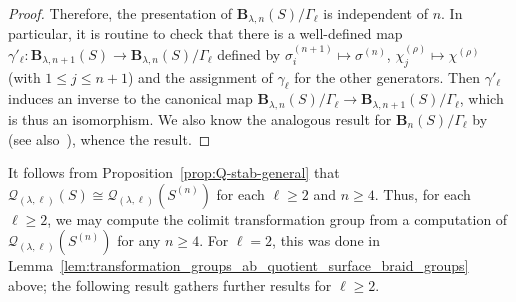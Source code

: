 \documentclass[AHL,Unicode,published]{cedram}
\newcommand{\B}{\ensuremath{\mathbf{B}}}
\newcommand{\LCS}{\varGamma}
\newcommand{\cQ}{\mathcal{Q}}
\renewcommand{\geq}{\geqslant}
\renewcommand{\leq}{\leqslant}
\begin{document}
\begin{proof}
Therefore, the presentation of $\B_{\lambda,n}(S)/\LCS_{\ell}$ is independent of $n$. In particular, it is routine to check that there is a well-defined map $\gamma'_{\ell}\colon\B_{\lambda,n+1}(S)\to \B_{\lambda,n}(S)/\LCS_{\ell}$ defined by $\sigma_{i}^{(n+1)}\mapsto \sigma^{(n)}$, $\chi^{(\rho)}_j\mapsto \chi^{(\rho)}$ (with $1\leq j\leq n+1$) and the assignment of $\gamma_{\ell}$ for the other generators. Then $\gamma'_{\ell}$ induces an inverse to the canonical map $\B_{\lambda,n}(S)/\LCS_{\ell}\to \B_{\lambda,n+1}(S)/\LCS_{\ell}$, which is thus an isomorphism. We also know the analogous result for $\B_{n}(S)/\LCS_{\ell}$ by~\cite[Prop.~3.13]{BellingeriGodelleGuaschi} (see also~\cite[Prop.~6.43]{DPS}), whence the result.
\end{proof}

It follows from Proposition~\ref{prop:Q-stab-general} that $\cQ_{(\lambda,\ell)}(S) \cong \cQ_{(\lambda,\ell)}(S^{(n)})$ for each $\ell\geq 2$ and $n\geq 4$. Thus, for each $\ell \geq 2$, we may compute the colimit transformation group from a computation of $\cQ_{(\lambda,\ell)}(S^{(n)})$ for any $n\geq 4$. For $\ell = 2$, this was done in Lemma~\ref{lem:transformation_groups_ab_quotient_surface_braid_groups} above; the following result gathers further results for $\ell \geq 2$.
\end{document}
